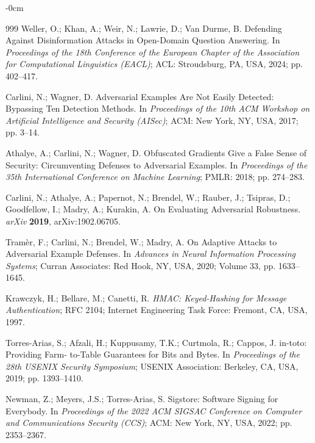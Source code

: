 \documentclass[information,article,submit,moreauthors]{Definitions/mdpi}
\begin{document}
\begin{adjustwidth}{-\extralength}{0cm}
\begin{thebibliography}{999}
Weller, O.; Khan, A.; Weir, N.; Lawrie, D.; Van Durme, B. Defending Against Disinformation
Attacks in Open-Domain Question Answering. In \textit{Proceedings of the 18th Conference of the
European Chapter of the Association for Computational Linguistics (EACL)}; ACL: Stroudsburg,
PA, USA, 2024; pp. 402--417.


Carlini, N.; Wagner, D. Adversarial Examples Are Not Easily Detected: Bypassing Ten Detection
Methods. In \textit{Proceedings of the 10th ACM Workshop on Artificial Intelligence and
Security (AISec)}; ACM: New York, NY, USA, 2017; pp. 3--14.

Athalye, A.; Carlini, N.; Wagner, D. Obfuscated Gradients Give a False Sense of Security:
Circumventing Defenses to Adversarial Examples. In \textit{Proceedings of the 35th
International Conference on Machine Learning}; PMLR: 2018; pp. 274--283.

Carlini, N.; Athalye, A.; Papernot, N.; Brendel, W.; Rauber, J.; Tsipras, D.; Goodfellow, I.;
Madry, A.; Kurakin, A. On Evaluating Adversarial Robustness. \textit{arXiv} \textbf{2019},
arXiv:1902.06705.

Tram\`er, F.; Carlini, N.; Brendel, W.; Madry, A. On Adaptive Attacks to Adversarial Example
Defenses. In \textit{Advances in Neural Information Processing Systems}; Curran Associates: Red
Hook, NY, USA, 2020; Volume 33, pp. 1633--1645.


Krawczyk, H.; Bellare, M.; Canetti, R. \textit{HMAC: Keyed-Hashing for Message Authentication};
RFC 2104; Internet Engineering Task Force: Fremont, CA, USA, 1997.

Torres-Arias, S.; Afzali, H.; Kuppusamy, T.K.; Curtmola, R.; Cappos, J. in-toto: Providing Farm-
to-Table Guarantees for Bits and Bytes. In \textit{Proceedings of the 28th USENIX Security
Symposium}; USENIX Association: Berkeley, CA, USA, 2019; pp. 1393--1410.

Newman, Z.; Meyers, J.S.; Torres-Arias, S. Sigstore: Software Signing for Everybody. In
\textit{Proceedings of the 2022 ACM SIGSAC Conference on Computer and Communications Security
(CCS)}; ACM: New York, NY, USA, 2022; pp. 2353--2367.


\end{thebibliography}
\end{adjustwidth}
\end{document}
